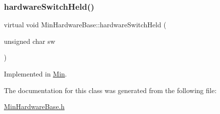 \subsubsection{\texorpdfstring{hardware\+Switch\+Held()}{hardwareSwitchHeld()}}
{\footnotesize\ttfamily virtual void Min\+Hardware\+Base\+::hardware\+Switch\+Held (\begin{DoxyParamCaption}\item[{unsigned char}]{sw }\end{DoxyParamCaption})\hspace{0.3cm}{\ttfamily [pure virtual]}}



Implemented in \hyperlink{class_min_aa17c2510883d894f135d6a0582cc8bea}{Min}.



The documentation for this class was generated from the following file\+:\begin{DoxyCompactItemize}
\item 
\hyperlink{_min_hardware_base_8h}{Min\+Hardware\+Base.\+h}\end{DoxyCompactItemize}
